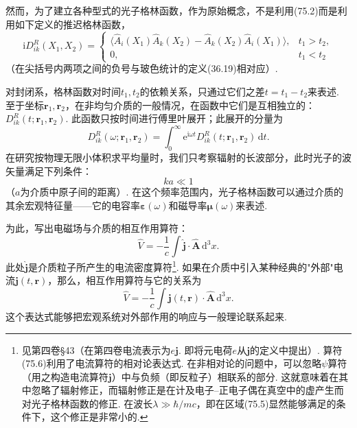 然而，为了建立各种型式的光子格林函数，作为原始概念，不是利用(75.2)而是利用如下定义的推迟格林函数，
\begin{equation}
\mathrm{i}D_{ik}^{R}(X_{1},X_{2})=
\begin{cases}
\langle\hat{A}_{i}(X_{1})\hat{A}_{k}(X_{2})-\hat{A}_{k}(X_{2})\hat{A}_{i}(X_{1})\rangle, & t_{1}>t_{2},\\
0, & t_{1}<t_{2}
\end{cases}
\end{equation}
（在尖括号内两项之间的负号与玻色统计的定义(36.19)相对应）.

对封闭系，格林函数对时间$t_{1},t_{2}$的依赖关系，只通过它们之差$t=t_{1}-t_{2}$来表述. 至于坐标$\bm{r}_{1},\bm{r}_{2}$，在非均匀介质的一般情况，在函数中它们是互相独立的：$D_{ik}^{R}(t;\bm{r}_{1},\bm{r}_{2})$. 此函数只按时间进行傅里叶展开；此展开的分量为
\begin{equation}
D_{ik}^{R}(\omega;\bm{r}_{1},\bm{r}_{2})=\int_{0}^{\infty}\mathrm{e}^{\mathrm{i}\omega t}D_{ik}^{R}(t;\bm{r}_{1},\bm{r}_{2})\,\mathrm{d}t.
\end{equation}
在研究按物理无限小体积求平均量时，我们只考察辐射的长波部分，此时光子的波矢量满足下列条件：
\begin{equation}
ka\ll1
\end{equation}
（$a$为介质中原子间的距离）. 在这个频率范围内，光子格林函数可以通过介质的其余宏观特征量——它的电容率$\bm{\varepsilon}(\omega)$和磁导率$\bm{\mu}(\omega)$来表述.

为此，写出电磁场与介质的相互作用算符：
\begin{equation}
\hat{V}=-\frac{1}{c}\int\hat{\bm{j}}\cdot\hat{\bm{A}}\,\mathrm{d}^{3}x.
\end{equation}
此处$\hat{\bm{j}}$是介质粒子所产生的电流密度算符\footnote{见第四卷§43（在第四卷电流表示为$e\bm{j}$. 即将元电荷$e$从$\bm{j}$的定义中提出）. 算符(75.6)利用了电流算符的相对论表达式. 在非相对论的问题中，可以忽略$\psi$算符（用之构造电流算符$\bm{j}$）中与负频（即反粒子）相联系的部分. 这就意味着在其中忽略了辐射修正，而辐射修正是在计及电子–正电子偶在真空中的虚产生而对光子格林函数的修正. 在波长$\lambda\gg\hbar/mc$，即在区域(75.5)显然能够满足的条件下，这个修正是非常小的.}. 如果在介质中引入某种经典的"外部"电流$\bm{j}(t,\bm{r})$，那么，相互作用算符与它的关系为
\begin{equation}
\hat{V}=-\frac{1}{c}\int\bm{j}(t,\bm{r})\cdot\hat{\bm{A}}\,\mathrm{d}^{3}x.
\end{equation}
这个表达式能够把宏观系统对外部作用的响应与一般理论联系起来.

